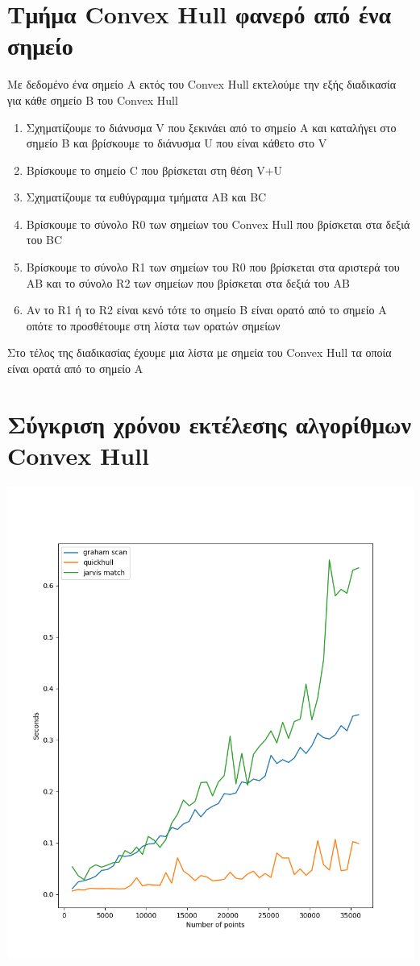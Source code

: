 \documentclass{article}
\begin{document}
\section{Τμήμα Convex Hull φανερό από ένα σημείο}

Με δεδομένο ένα σημείο A εκτός του Convex Hull εκτελούμε την εξής διαδικασία για κάθε σημείο B του Convex Hull
\begin{enumerate}
	\item Σχηματίζουμε το διάνυσμα V που ξεκινάει από το σημείο A και καταλήγει στο σημείο B και βρίσκουμε το διάνυσμα U που είναι κάθετο στο V
	\item Βρίσκουμε το σημείο C που βρίσκεται στη θέση V+U
	\item Σχηματίζουμε τα ευθύγραμμα τμήματα AB και BC
	\item Βρίσκουμε το σύνολο R0 των σημείων του Convex Hull που βρίσκεται στα δεξιά του BC
	\item Βρίσκουμε το σύνολο R1 των σημείων του R0 που βρίσκεται στα αριστερά του AB και το σύνολο R2 των σημείων που βρίσκεται στα δεξιά του ΑΒ
	\item Αν το R1 ή το R2 είναι κενό τότε το σημείο Β είναι ορατό από το σημείο Α οπότε το προσθέτουμε στη λίστα των ορατών σημείων
\end{enumerate}

\noindent
Στο τέλος της διαδικασίας έχουμε μια λίστα με σημεία του Convex Hull τα οποία είναι ορατά από το σημείο A

\section{Σύγκριση χρόνου εκτέλεσης αλγορίθμων Convex Hull}

\includegraphics[width=\textwidth]{"algorithm plot.png"}
\end{document}
